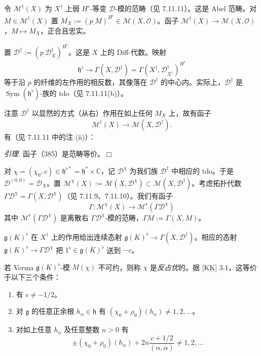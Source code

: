  令 $\mathcal{M}^{\dagger}(X)$ 为 $X^{\dagger}$ 上弱 $H^{\flat}$-等变 $\mathcal{D}$-模的范畴（见 7.11.11）。这是 Abel 范畴。对 $M\in\mathcal{M}^{\dagger}(X)$ 置 $M_X:=(p_{\cdot}M)^{H^{\flat}}\in\mathcal{M}(X,\mathcal{O})$。函子 $\mathcal{M}^{\dagger}(X)\to\mathcal{M}(X,\mathcal{O})$，$M\mapsto M_X$，正合且忠实。

置 $\mathcal{D}^{\dagger}:=(p_{\cdot}\mathcal{D}^{\dagger}_X)^{H^{\flat}}$。这是 $X$ 上的 Diff-代数。映射
\begin{equation}\tag{384}
\mathfrak{h}^{\flat}\to\Gamma(X,\mathcal{D}^{\dagger})=\Gamma(X^{\dagger},\mathcal{D}^{\dagger}_{X^{\dagger}})^{H^{\flat}}
\end{equation}
等于沿 $p$ 的纤维的左作用的相反数，其像落在 $\mathcal{D}^{\dagger}$ 的中心内。实际上，$\mathcal{D}^{\dagger}$ 是 $\operatorname{Sym}(\mathfrak{h}^{\flat})$-族的 tdo（见 7.11.11(b)）。

注意 $\mathcal{D}^{\dagger}$ 以显然的方式（从右）作用在如上任何 $M_X$ 上，故有函子
\begin{equation}\tag{385}
\mathcal{M}^{\dagger}(X)\to\mathcal{M}(X,\mathcal{D}^{\dagger}).
\end{equation}
有（见 7.11.11 中的注 (ii)）：

 \emph{引理.} 函子（385）是范畴等价。\hfill$\Box$

 对 $\chi=(\chi_0,c)\in\mathfrak{h}^{\flat*}=\mathfrak{h}^{*}\times\mathbb{C}$，记 $\mathcal{D}^{\chi}$ 为我们族 $\mathcal{D}^{\dagger}$ 中相应的 tdo。于是 $\mathcal{D}^{(0,0)}=\mathcal{D}_X$。置 $\mathcal{M}^{\chi}(X):=\mathcal{M}(X,\mathcal{D}^{\chi})\subset\mathcal{M}(X,\mathcal{D}^{\dagger})$。考虑拓扑代数 $\Gamma\mathcal{D}^{\chi}=\Gamma(X,\mathcal{D}^{\chi})$（见 7.11.9、7.11.10）。我们有函子
\begin{equation}\tag{386}
\Gamma:\mathcal{M}^{\chi}(X)\to\mathcal{M}^{r}(\Gamma\mathcal{D}^{\chi})
\end{equation}
其中 $\mathcal{M}^{r}(\Gamma\mathcal{D}^{\chi})$ 是离散右 $\Gamma\mathcal{D}^{\chi}$-模的范畴，$\Gamma M:=\Gamma(X,M)$。

$\mathfrak{g}(K)^{\flat}$ 在 $X^{\dagger}$ 上的作用给出连续态射 $\mathfrak{g}(K)^{\flat}\to\Gamma(X,\mathcal{D}^{\dagger})$。相应的态射 $\mathfrak{g}(K)^{\flat}\to\Gamma\mathcal{D}^{\chi}$ 把 $1^{\flat}\in\mathfrak{g}(K)^{\flat}$ 送到 $-c$。

 若 Verma $\mathfrak{g}(K)^{\flat}$-模 $M(\chi)$ 不可约，则称 $\chi$ 是\emph{反占优}的。据 [KK] 3.1，这等价于以下三个条件：
\begin{enumerate}[label=(\roman*),leftmargin=2.2em]
\item 有 $c\ne-1/2$。
%
\item 对 $\mathfrak{g}$ 的任意正余根 $h_{\alpha}\in\mathfrak{h}$ 有 $(\chi_0+\rho_0)(h_{\alpha})\ne1,2,\ldots$。
\item 对如上任意 $h_{\alpha}$ 及任意整数 $n>0$ 有
\[
\pm(\chi_0+\rho_0)(h_{\alpha})+2n\frac{c+1/2}{(\alpha,\alpha)}\ne1,2,\ldots
\]
\end{enumerate}

